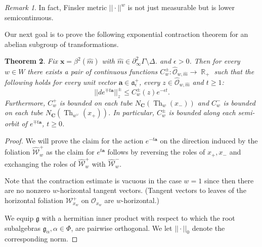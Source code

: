 \documentclass[12pt]{amsbook}%
\newtheorem{thm}{Theorem}[chapter]
\theoremstyle{definition}
\theoremstyle{remark}
\newtheorem{rem}[thm]{Remark}
\numberwithin{section}{chapter}
\numberwithin{subsection}{section}
\numberwithin{figure}{chapter}
\DeclareMathOperator{\Th}{Th}
\DeclareMathOperator{\R}{\mathbb{R}}
\def\eps{\epsilon}
\def\cO{{\mathscr{O}}}
\def\cW{{\mathscr{W}}}
\def\CC{{\mathbf{C}}}
\def\ba{\mathbf{a}}
\def\bx{\mathbf{x}}
\def\Ga{\Gamma}
\def\al{\alpha}
\begin{document}
{{\begin{rem}
In fact, Finsler metric $||\cdot||^w$ is not just measurable but is lower semicontinuous. 
\end{rem}


Our next goal is to prove the following exponential contraction theorem for an abelian subgroup of transformations. 


\begin{thm}\label{thm:transvection contraction} 
Fix $\bx = \beta^2(\hat{m})$ with $\hat{m} \in \partial_\infty^2 \Ga \setminus \Delta$. 
and  $\eps>0$. Then for every $w\in W$ there exists a pair of continuous functions $C_w^\pm: \hat{\cO}_{w,\hat{m}}\to \R_+$ 
such that the following holds for every unit vector $\ba\in \mathfrak{a}^+_{\eps}$, every $z\in \hat{\cO}_{w,\hat{m}}$ and $t\geqslant 1$: 
$$
||de^{\mp t\ba}||_z^\pm \leqslant C_w^\pm(z) e^{-\eps t}.  
$$
Furthermore, $C_w^+$ is bounded on each tube $N_{\CC}(\Th_w(x_-))$ and $C_w^-$ is bounded on each tube $N_{\CC}(\Th_{w^\vee}(x_+))$. In particular, 
$C_w^\pm$ is bounded along each semi-orbit of $e^{\mp t\ba}$, $t\geqslant 0$. 
\end{thm}
\begin{proof} We will prove the claim for the action $e^{-t\ba}$ on the direction induced by the foliation $\hat{\cW}^+_w$ as the claim for  $e^{t\ba}$ follows by reversing the roles of $x_+, x_-$ and exchanging the roles of $\hat{\cW}^+_w$ with $\hat{\cW}^-_w$. 

Note that the contraction estimate is vacuous in the case $w=1$ since then there are no nonzero $w$-horizontal tangent vectors. 
(Tangent vectors to leaves of the horizontal foliation $\cW^+_{x_w}$ on $\cO_{x_w}$ are $w$-horizontal.) 


We equip ${\mathfrak g}$ with a hermitian inner product with respect to which the root subalgebras ${\mathfrak g}_\al, \al\in \Phi$, 
are pairwise orthogonal. We let $||\cdot||_0$ denote the corresponding norm. 


\end{proof}}}
\end{document}
